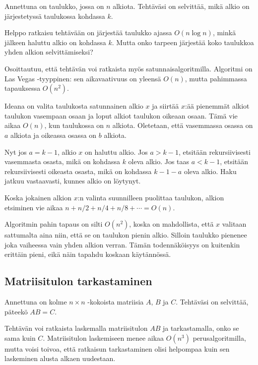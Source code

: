 \begin{task}
Annettuna on taulukko, jossa on $n$ alkiota.
Tehtäväsi on selvittää, mikä alkio on järjestetyssä
taulukossa kohdassa $k$.
\end{task}

Helppo ratkaisu tehtävään on järjestää
taulukko ajassa $O(n \log n)$, minkä jälkeen
haluttu alkio on kohdassa $k$.
Mutta onko tarpeen järjestää koko taulukkoa
yhden alkion selvittämiseksi?

Osoittautuu, että tehtävän voi ratkaista myös
satunnaisalgoritmilla.
Algoritmi on Las Vegas -tyyppinen:
sen aikavaativuus on yleensä $O(n)$,
mutta pahimmassa tapauksessa $O(n^2)$.

Ideana on valita taulukosta satunnainen alkio $x$
ja siirtää $x$:ää pienemmät alkiot
taulukon vasempaan osaan ja loput alkiot
taulukon oikeaan osaan.
Tämä vie aikaa $O(n)$, kun taulukossa on $n$ alkiota.
Oletetaan, että vasemmassa osassa on $a$
alkiota ja oikeassa osassa on $b$ alkiota.

Nyt jos $a=k-1$, alkio $x$ on haluttu alkio.
Jos $a>k-1$, etsitään rekursiivisesti
vasemmasta osasta, mikä on kohdassa $k$ oleva alkio.
Jos taas $a<k-1$, etsitään rekursiivisesti
oikeasta osasta, mikä on kohdassa $k-1-a$ oleva alkio.
Haku jatkuu vastaavasti, kunnes alkio on löytynyt.

Koska jokainen alkion $x$:n valinta
suunnilleen puolittaa taulukon,
alkion etsiminen vie aikaa $n+n/2+n/4+n/8+\cdots=O(n)$.

Algoritmin pahin tapaus on silti $O(n^2)$,
koska on mahdollista,
että $x$ valitaan sattumalta aina niin,
että se on taulukon pienin alkio.
Silloin taulukko pienenee joka vaiheessa
vain yhden alkion verran.
Tämän todennäköisyys on kuitenkin erittäin pieni,
eikä näin tapahdu koskaan käytännössä.

\subsection{Matriisitulon tarkastaminen}

\begin{task}
Annettuna on kolme $n \times n$ -kokoista matriisia
$A$, $B$ ja $C$.
Tehtäväsi on selvittää, päteekö $AB=C$.
\end{task}

Tehtävän voi ratkaista laskemalla matriisitulon
$AB$ ja tarkastamalla, onko se sama kuin $C$.
Matriisitulon laskemiseen menee aikaa
$O(n^3)$ perusalgoritmilla, mutta voisi toivoa,
että ratkaisun tarkastaminen olisi helpompaa
kuin sen laskeminen alusta alkaen uudestaan.

